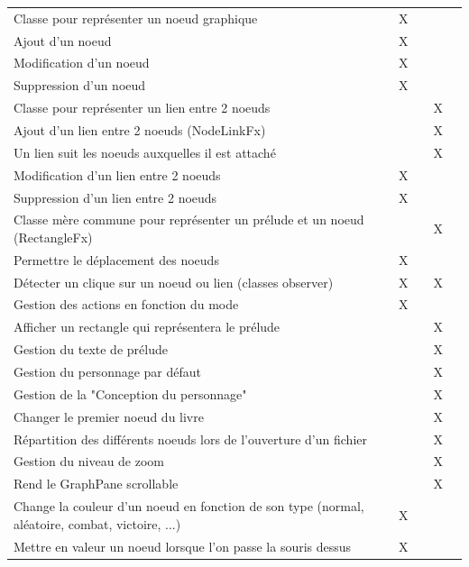 \begin{centering}
\begin{longtable}{|p{8cm}|c|c|c|c|}
				\rowcolor{lightgray} \multicolumn{5}{|c|}{ \textbf{Zone d'édition}}\\
				\hline
				Classe pour représenter un noeud graphique & X & & & \\
				\hline
				Ajout d'un noeud & X & & & \\
				\hline
				Modification d'un noeud & X & & & \\
				\hline
				Suppression d'un noeud & X & & & \\
				\hline
				Classe pour représenter un lien entre 2 noeuds & & & X & \\
				\hline
				Ajout d'un lien entre 2 noeuds (NodeLinkFx) & & & X & \\
				\hline
				Un lien suit les noeuds auxquelles il est attaché& & & X & \\
				\hline
				Modification d'un lien entre 2 noeuds & X & & & \\
				\hline
				Suppression d'un lien entre 2 noeuds & X & & & \\
				\hline
				Classe mère commune pour représenter un prélude et un noeud (RectangleFx) & & & X & \\
				\hline
				Permettre le déplacement des noeuds & X & & & \\
				\hline
				Détecter un clique sur un noeud ou lien (classes observer) & X & & X & \\
				\hline
				Gestion des actions en fonction du mode & X & & & \\
				\hline
				Afficher un rectangle qui représentera le prélude & & & X & \\
				\hline
				Gestion du texte de prélude & & & X & \\
				\hline
				Gestion du personnage par défaut & & & X & \\
				\hline
				Gestion de la "Conception du personnage" & & & X & \\
				\hline
				Changer le premier noeud du livre & & & X & \\
				\hline
				Répartition des différents noeuds lors de l'ouverture d'un fichier& & & X & \\
				\hline
				Gestion du niveau de zoom& & & X & \\
				\hline
				Rend le GraphPane scrollable& & & X & \\
				\hline
				Change la couleur d'un noeud en fonction de son type (normal, aléatoire, combat, victoire, ...) & X & & & \\
				\hline
				Mettre en valeur un noeud lorsque l'on passe la souris dessus & X & & & \\
				\hline


\end{longtable}
\end{centering}

